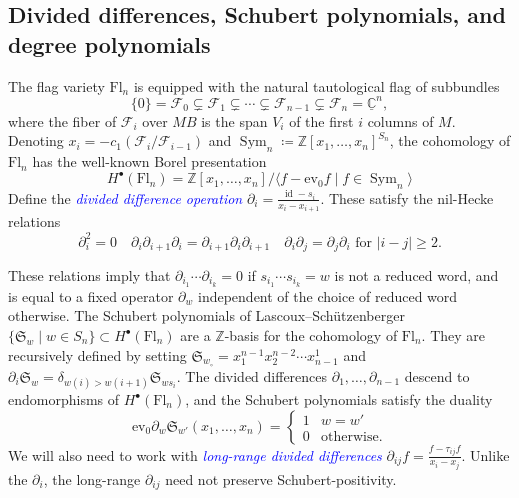 \documentclass[11pt]{amsart}
\theoremstyle{definition}
\numberwithin{equation}{section}
\newcommand{\sym}[1]{\operatorname{Sym}_{#1}} %
\newcommand{\suchthat}{\;|\;}
\newcommand{\schub}[1]{\mathfrak{S}_{#1}} %
\newcommand{\idem}{\operatorname{id}} %
\newcommand{\ct}{\operatorname{ev_0}} %
\newcommand{\fl}[1]{\mathrm{Fl}_{#1}}
\renewcommand\emph[1]{\textcolor{blue}{\textit{#1}}} %
\begin{document}
\subsection{Divided differences, Schubert polynomials, and degree polynomials}
\label{subsec:divdiff}

The flag variety $\fl{n}$ is equipped with the natural tautological flag of subbundles $$\{0\}=\mathcal{F}_0\subsetneq \mathcal{F}_1\subsetneq \cdots \subsetneq \mathcal{F}_{n-1}\subsetneq \mathcal{F}_n=\underline{\mathbb{C}}^n,$$
where the fiber of $\mathcal{F}_i$ over $MB$ is the span $V_i$ of the first $i$ columns of $M$. Denoting $x_i=-c_1(\mathcal{F}_i/\mathcal{F}_{i-1})$ and $\sym{n}\coloneqq \mathbb{Z}[x_1,\ldots,x_n]^{S_n}$,
the cohomology of $\fl{n}$ has the well-known Borel presentation \cite{Bor53}
$$H^\bullet(\fl{n})=\mathbb{Z}[x_1,\ldots,x_n]/\langle f-\ct f\suchthat f\in \sym{n}\rangle$$
Define the \emph{divided difference operation} $\partial_i=\frac{\idem-s_i}{x_i-x_{i+1}}$.
These satisfy the nil-Hecke relations
$$\partial_i^2=0\quad \partial_i\partial_{i+1}\partial_i=\partial_{i+1}\partial_i\partial_{i+1}\quad \partial_i\partial_j=\partial_j\partial_i\text{ for }|i-j|\ge 2.$$

These relations imply that $\partial_{i_1}\cdots \partial_{i_k}=0$ if $s_{i_1}\cdots s_{i_k}=w$ is not a reduced word, and is equal to a fixed operator $\partial_w$ independent of the choice of reduced word otherwise.
The Schubert polynomials of Lascoux--Sch\"utzenberger \cite{LS82} $\{\schub{w}\suchthat w\in S_n\}\subset H^\bullet(\fl{n})$ are a $\mathbb{Z}$-basis for the cohomology of $\fl{n}$.
They are recursively defined by setting $\schub{w_\circ}=x_1^{n-1}x_2^{n-2}\cdots x_{n-1}^1$ and $\partial_i\schub{w}=\delta_{w(i)>w(i+1)}\schub{ws_i}$.
The divided differences $\partial_1,\ldots,\partial_{n-1}$ descend to endomorphisms of $H^\bullet(\fl{n})$, and the Schubert polynomials satisfy the duality \begin{equation}
\label{eqn:ev0duality}\ct\partial_{w}\schub{w'}(x_1,\ldots,x_n)=\begin{cases}1&w=w'\\0&\text{otherwise.}\end{cases}\end{equation}
We will also need to work with \emph{long-range divided differences} $\partial_{ij}f=\frac{f-\tau_{ij}f}{x_i-x_j}$.
Unlike the $\partial_i$, the long-range $\partial_{ij}$ need not preserve Schubert-positivity.
\end{document}

